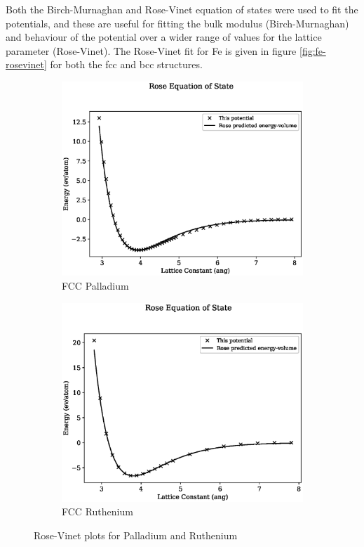 Both the Birch-Murnaghan and Rose-Vinet equation of states were used to fit the potentials, and these are useful for fitting the bulk modulus (Birch-Murnaghan) and behaviour of the potential over a wider range of values for the lattice parameter (Rose-Vinet). The Rose-Vinet fit for Fe is given in figure \ref{fig:fe-rosevinet} for both the \acrshort{fcc} and \acrshort{bcc} structures.

\begin{figure}[htb]
\begin{subfigure}{.48\textwidth}
  \centering
  \includegraphics[width=.94\linewidth]{chapters/potentials_fe_pd_ru/fepd_potential/eos/rose_plot_bp_2.eps}  
  \caption{FCC Palladium}
  \label{fig:rose-vinet-fcc-pd}
\end{subfigure}
\begin{subfigure}{.48\textwidth}
  \centering
  \includegraphics[width=.94\linewidth]{chapters/potentials_fe_pd_ru/feru_potential/eos/rose_plot_bp_2.eps}  
  \caption{FCC Ruthenium}
  \label{fig:rose-vinet-fcc-ru}
\end{subfigure}
\label{fig:rupd-rosevinet}
\caption{Rose-Vinet plots for Palladium and Ruthenium}
\end{figure}

